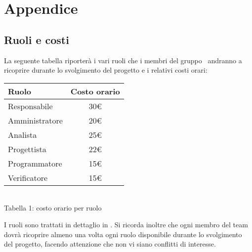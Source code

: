 \section{Appendice}
\subsection{Ruoli e costi}
La seguente tabella riporterà i vari ruoli che i membri del gruppo \gruppo ~andranno a ricoprire durante lo svolgimento del progetto e i relativi costi orari:
\begin{center}
\centering
\begin{tabular}{| l | c |}
\hline
Ruolo & Costo orario \\
\hline
Responsabile & 30\euro \\
Amministratore & 20\euro \\
Analista & 25\euro \\
Progettista & 22\euro \\
Programmatore & 15\euro \\
Verificatore & 15\euro \\
\hline
\end{tabular}
\\
Tabella 1: costo orario per ruolo
\end{center}
I ruoli sono trattati in dettaglio in \VerbaleB.
Si ricorda inoltre che ogni membro del team dovrà ricoprire almeno una volta ogni ruolo disponibile durante lo svolgimento del progetto, facendo attenzione che non vi siano conflitti di interesse.
